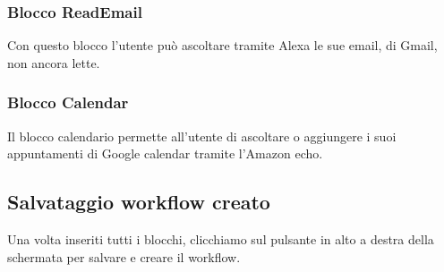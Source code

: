\subsubsection{Blocco ReadEmail}
Con questo blocco l'utente può ascoltare tramite Alexa le sue email, di Gmail, non ancora lette.

\subsubsection{Blocco Calendar}
Il blocco calendario permette all'utente di ascoltare o aggiungere i suoi appuntamenti di Google calendar tramite l'Amazon echo.
\newpage
\subsection{Salvataggio workflow creato}
Una volta inseriti tutti i blocchi, clicchiamo sul pulsante in alto a destra della schermata per salvare e creare il workflow.
